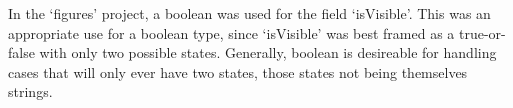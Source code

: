 In the `figures' project, a boolean was used for the field `isVisible'.
This was an appropriate use for a boolean type, since `isVisible' was
best framed as a true-or-false with only two possible states. Generally,
boolean is desireable for handling cases that will only ever have two
states, those states not being themselves strings.

